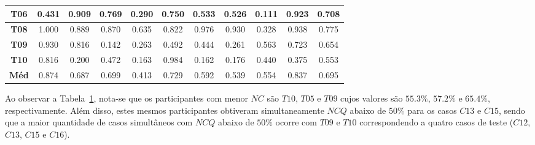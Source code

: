\begin{table}[htbp]
\begin{tabular}{|c|ccccccccc|c|}
		\textbf{T06} & \multicolumn{1}{c|}{0.431} & \multicolumn{1}{c|}{0.909} & \multicolumn{1}{c|}{0.769} & \multicolumn{1}{c|}{0.290} & \multicolumn{1}{c|}{0.750} & \multicolumn{1}{c|}{0.533} & \multicolumn{1}{c|}{0.526} & \multicolumn{1}{c|}{0.111} & 0.923 & 0.708 \\ \hline
		\rowcolor[HTML]{F2F2F2} 
		\textbf{T08} & \multicolumn{1}{c|}{\cellcolor[HTML]{F2F2F2}1.000} & \multicolumn{1}{c|}{\cellcolor[HTML]{F2F2F2}0.889} & \multicolumn{1}{c|}{\cellcolor[HTML]{F2F2F2}0.870} & \multicolumn{1}{c|}{\cellcolor[HTML]{F2F2F2}0.635} & \multicolumn{1}{c|}{\cellcolor[HTML]{F2F2F2}0.822} & \multicolumn{1}{c|}{\cellcolor[HTML]{F2F2F2}0.976} & \multicolumn{1}{c|}{\cellcolor[HTML]{F2F2F2}0.930} & \multicolumn{1}{c|}{\cellcolor[HTML]{F2F2F2}0.328} & 0.938 & 0.775 \\ \hline
		\textbf{T09} & \multicolumn{1}{c|}{0.930} & \multicolumn{1}{c|}{0.816} & \multicolumn{1}{c|}{0.142} & \multicolumn{1}{c|}{0.263} & \multicolumn{1}{c|}{0.492} & \multicolumn{1}{c|}{0.444} & \multicolumn{1}{c|}{0.261} & \multicolumn{1}{c|}{0.563} & 0.723 & 0.654 \\ \hline
		\rowcolor[HTML]{F2F2F2} 
		\textbf{T10} & \multicolumn{1}{c|}{\cellcolor[HTML]{F2F2F2}0.816} & \multicolumn{1}{c|}{\cellcolor[HTML]{F2F2F2}0.200} & \multicolumn{1}{c|}{\cellcolor[HTML]{F2F2F2}0.472} & \multicolumn{1}{c|}{\cellcolor[HTML]{F2F2F2}0.163} & \multicolumn{1}{c|}{\cellcolor[HTML]{F2F2F2}0.984} & \multicolumn{1}{c|}{\cellcolor[HTML]{F2F2F2}0.162} & \multicolumn{1}{c|}{\cellcolor[HTML]{F2F2F2}0.176} & \multicolumn{1}{c|}{\cellcolor[HTML]{F2F2F2}0.440} & 0.375 & 0.553 \\ \hline
		\cellcolor[HTML]{F2F2F2}\textbf{Méd} & \multicolumn{1}{c|}{0.874} & \multicolumn{1}{c|}{0.687} & \multicolumn{1}{c|}{0.699} & \multicolumn{1}{c|}{0.413} & \multicolumn{1}{c|}{0.729} & \multicolumn{1}{c|}{0.592} & \multicolumn{1}{c|}{0.539} & \multicolumn{1}{c|}{0.554} & 0.837 & 0.695 \\ \hline
	\end{tabular}
	\label{tab:F3_A2_NCQ_EV1_2}
\end{table}

Ao observar a Tabela~\ref{tab:F3_A2_NCQ_EV1_2}, nota-se que os participantes com menor $NC$ são $T10$, $T05$ e $T09$ cujos valores são $55.3\%$, $57.2\%$ e $65.4\%$, respectivamente. Além disso, estes mesmos participantes obtiveram simultaneamente $NCQ$ abaixo de $50\%$ para os casos $C13$ e $C15$, sendo que a maior quantidade de casos simultâneos com $NCQ$ abaixo de $50\%$ ocorre com $T09$ e $T10$ correspondendo a quatro casos de teste ($C12$, $C13$, $C15$ e $C16$).

